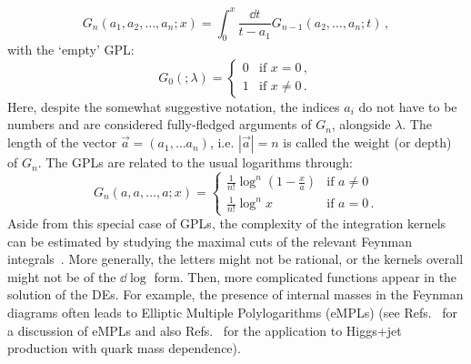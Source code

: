 \documentclass[main.tex]{subfiles}
\begin{document}
\begin{equation} \label{eq:GPLs}
    G_n(a_1, a_2, \ldots, a_n; x) = \int_0^x \frac{\dd t}{t-a_1} G_{n-1}(a_2, \ldots, a_n; t)\,,
\end{equation}
with the `empty' GPL:
\begin{equation}
    G_0(; \lambda) = 
    \begin{cases}
        0 & \text{if } x = 0\,, \\
        1 & \text{if } x \neq 0\,. 
    \end{cases}
\end{equation}
Here, despite the somewhat suggestive notation, the indices $a_i$ do not have to be numbers and are considered fully-fledged arguments of $G_n$, alongside $\lambda$. The length of the vector $\vec{a} = (a_1, \ldots a_n)$, i.e. $|\vec{a}|=n$ is called the weight (or depth) of $G_n$. The GPLs are related to the usual logarithms through:
\begin{equation}
    G_n(a, a, \ldots, a; x) = 
    \begin{cases}
        \frac{1}{n!}\log^n\left(1-\frac{x}{a}\right) & \text{if  $a \neq 0$} \\ 
        \frac{1}{n!}\log^n x & \text{if $a = 0$}\,.
    \end{cases}
\end{equation}  
Aside from this special case of GPLs, the complexity of the integration kernels can be estimated by studying the maximal cuts of the relevant Feynman integrals~\cite{Tancredi:2017onthemaxcut, Abreu:2020jxa, abreu2021twoloop}. More generally, the letters might not be rational, or the kernels overall might not be of the $\dd \log$ form. Then, more complicated functions appear in the solution of the DEs.  For example, the presence of internal masses in the Feynman diagrams often leads to Elliptic Multiple Polylogarithms (eMPLs) (see Refs.~ \cite{Broedel:2017kkb, Broedel:2017siw, Adams:2017ejb, Broedel:2018qkq, Adams:2018yfj, Walden:2020odh} for a discussion of eMPLs and also Refs.~\cite{Bonciani:2016qxi, Bonciani:2019jyb, Frellesvig:2019byn} for the application to Higgs+jet production with quark mass dependence). 
\end{document}
